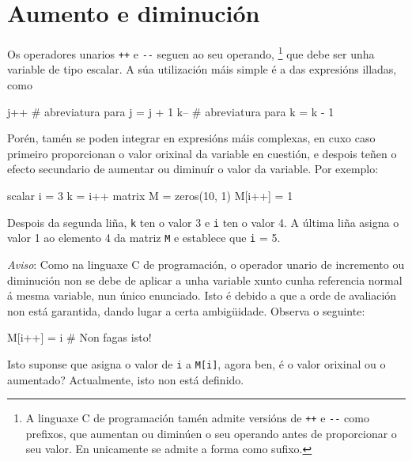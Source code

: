 \section{Aumento e diminución}

Os operadores unarios \texttt{++} e \verb|--| seguen ao seu operando,
\footnote{A linguaxe C de programación tamén admite versións de \texttt{++}
  e \verb|--| como prefixos, que aumentan ou diminúen o seu operando
  antes de proporcionar o seu valor. En  unicamente se admite
  a forma como sufixo.}  que debe ser unha variable de tipo escalar.
A súa utilización máis simple é a das expresións illadas, como
%
\begin{code}
j++  # abreviatura para j = j + 1
k--  # abreviatura para k = k - 1
\end{code}
%
Porén, tamén se poden integrar en expresións máis complexas, en cuxo
caso primeiro proporcionan o valor orixinal da variable en cuestión,
e despois teñen o efecto secundario de aumentar ou diminuír o valor
da variable. Por exemplo:
%
\begin{code}
scalar i = 3
k = i++
matrix M = zeros(10, 1)
M[i++] = 1
\end{code}
%
Despois da segunda liña, \texttt{k} ten o valor 3 e \texttt{i} ten o
valor 4. A última liña asigna o valor 1 ao elemento 4 da matriz
\texttt{M} e establece que \texttt{i} = 5.

\textit{Aviso}: Como na linguaxe C de programación, o operador unario
de incremento ou diminución non se debe de aplicar a unha variable
xunto cunha referencia normal á mesma variable, nun único enunciado.
Isto é debido a que a orde de avaliación non está garantida, dando
lugar a certa ambigüidade. Observa o seguinte:
%
\begin{code}
M[i++] = i # Non fagas isto!
\end{code}
%
Isto suponse que asigna o valor de \texttt{i} a \texttt{M[i]}, agora
ben, é o valor orixinal ou o aumentado? Actualmente, isto non está
definido.
